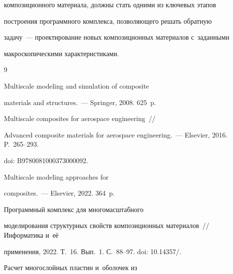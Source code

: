 композиционного материала, должны стать одними из ключевых этапов 


построения программного комплекса, позволяющего решать обратную  


задачу~--- проектирование новых композиционных материалов с~заданными 


макроскопическими характеристиками. 





{\small\frenchspacing


{%




\begin{thebibliography}{9}







 Multiscale modeling and simulation of composite 


materials and structures.~--- Springer, 2008. 625~p.







 Multiscale composites for aerospace engineering~/\!\!/ 


Advanced composite materials for aerospace engineering.~--- Elsevier, 2016. P.~265--293.


doi: B9780081000373000092.




 Multiscale modeling approaches for 


composites.~--- Elsevier, 2022. 364~p.







 Программный комплекс для многомасштабного 


моделирования структурных свойств композиционных материалов~/\!\!/ Информатика и~её 


применения, 2022. Т.~16. Вып.~1. С.~88--97. doi: 10.14357\!/.







 Расчет многослойных пластин и~оболочек из 



\end{thebibliography}}}
